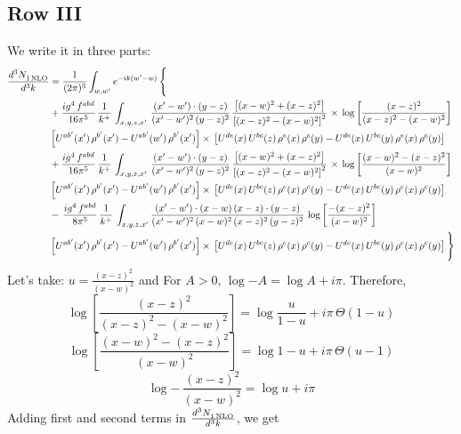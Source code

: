 \documentclass[9pt]{article}
\numberwithin{equation}{section}
\begin{document}
\subsection{Row III}
We write it in three parts:
\begin{align}
   \frac{d^{3}N_{1\,\rm NLO}^{\rm}}{d^{3}k}  & =  \frac{1}{(2\pi)^{3}}  \int_{w, w^\prime} e^{-ik(w^\prime-w)}\, \Bigg\{\notag \\
&  +\frac{ig^{4}\,f^{abd}}{16\pi^{5}}\, \frac{1}{k^{+}}\,\int_{x,y,z,x'}\, \frac{(x'-w')\cdot (y-z)}{(x'-w')^{2}\,(y-z)^{2}}\, \frac{\left[(x-w)^{2}+(x-z)^{2}\right]}{\left[(x-z)^{2}-(x-w)^{2}\right]^{2}}\, \times\, \log{\left[\frac{(x-z)^{2}}{(x-z)^{2}-(x-w)^{2}}\right]}\notag \\ & \left[U^{ab'}(x')\,\rho^{b'}(x')-U^{ab'}(w')\, \rho^{b'}(x')\right]\times\, \left[U^{de}(x)\,U^{bc}(z)\, \rho^{e}(x)\,\rho^{c}(y)-U^{de}(x)\,U^{bc}(y)\,\rho^{e}(x)\,\rho^{c}(y)\right] \notag \\
&  +\frac{ig^{4}\,f^{abd}}{16\pi^{5}}\, \frac{1}{k^{+}}\,\int_{x,y,z,x'}\, \frac{(x'-w')\cdot (y-z)}{(x'-w')^{2}\,(y-z)^{2}}\, \frac{\left[(x-w)^{2}+(x-z)^{2}\right]}{\left[(x-z)^{2}-(x-w)^{2}\right]^{2}}\, \times\, \log{\left[\frac{(x-w)^{2}-(x-z)^{2}}{(x-w)^{2}}\right]}\notag \\ & \left[U^{ab'}(x')\,\rho^{b'}(x')-U^{ab'}(w')\, \rho^{b'}(x')\right]\times\, \left[U^{de}(x)\,U^{bc}(z)\, \rho^{e}(x)\,\rho^{c}(y)-U^{de}(x)\,U^{bc}(y)\,\rho^{e}(x)\,\rho^{c}(y)\right] \notag \\
&-\, \frac{ig^{4}\,f^{abd}}{8\pi^{5}}\,\frac{1}{k^{+}}\,\int_{x,y,z,x'}\frac{(x'-w')\cdot (x-w)\, (x-z)\cdot (y-z)}{(x'-w')^{2}\, (x-w)^{2}\, (x-z)^{2}\, (y-z)^{2}}\,\log{\left[\frac{-(x-z)^{2}}{(x-w)^{2}}\right]} \notag \\ & \left[U^{ab'}(x')\,\rho^{b'}(x')-U^{ab'}(w')\, \rho^{b'}(x')\right]\times\, \left[U^{de}(x)\,U^{bc}(z)\, \rho^{e}(x)\,\rho^{c}(y)-U^{de}(x)\,U^{bc}(y)\,\rho^{e}(x)\,\rho^{c}(y)\right]\Bigg\}
\end{align}
Let's take: $u = \frac{(x-z)^{2}}{(x-w)^{2}}$ and For $A > 0$, $\log{-A} = \log{A} + i\pi$. Therefore,
$$ \log{\left[\frac{(x-z)^{2}}{(x-z)^{2}-(x-w)^{2}}\right]} = \log{\frac{u}{1-u}} + i\pi\,\Theta(1-u)$$
$$\log{\left[\frac{(x-w)^{2}-(x-z)^{2}}{(x-w)^{2}}\right]} = \log{1-u} + i\pi\,\Theta(u-1)$$
$$\log{-\,\frac{(x-z)^{2}}{(x-w)^{2}}} = \log{u} + i\pi$$
Adding first and second terms in $ \frac{d^{3}N_{1\,\rm NLO}^{\rm}}{d^{3}k} $, we get
\end{document}
